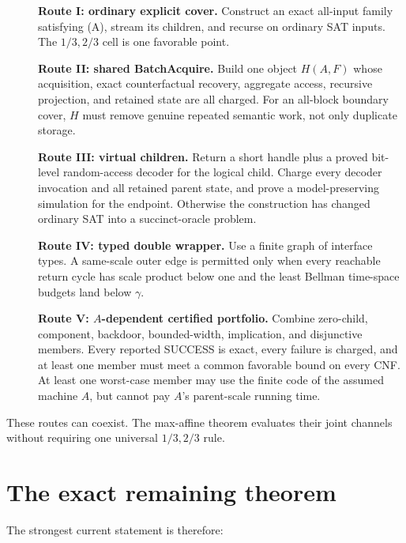 \documentclass[11pt]{article}
\begin{document}
\begin{description}
\item[] \textbf{Route I: ordinary explicit cover.}
Construct an exact all-input family satisfying (A), stream its children, and
recurse on ordinary SAT inputs.  The $1/3,2/3$ cell is one favorable point.

\item[] \textbf{Route II: shared BatchAcquire.}
Build one object $H(A,F)$ whose acquisition, exact counterfactual recovery,
aggregate access, recursive projection, and retained state are all charged.
For an all-block boundary cover, $H$ must remove genuine repeated semantic
work, not only duplicate storage.

\item[] \textbf{Route III: virtual children.}
Return a short handle plus a proved bit-level random-access decoder for the
logical child.  Charge every decoder invocation and all retained parent state,
and prove a model-preserving simulation for the endpoint.  Otherwise the
construction has changed ordinary SAT into a succinct-oracle problem.

\item[] \textbf{Route IV: typed double wrapper.}
Use a finite graph of interface types.  A same-scale outer edge is permitted
only when every reachable return cycle has scale product below one and the
least Bellman time-space budgets land below $\gamma$.

\item[] \textbf{Route V: $A$-dependent certified portfolio.}
Combine zero-child, component, backdoor, bounded-width, implication, and
disjunctive members.  Every reported SUCCESS is exact, every failure is
charged, and at least one member must meet a common favorable bound on every
CNF.  At least one worst-case member may use the finite code of the assumed
machine $A$, but cannot pay $A$'s parent-scale running time.
\end{description}

These routes can coexist.  The max-affine theorem evaluates their joint
channels without requiring one universal $1/3,2/3$ rule.

\section{The exact remaining theorem}

The strongest current statement is therefore:
\begin{center}
\end{center}
\end{document}
